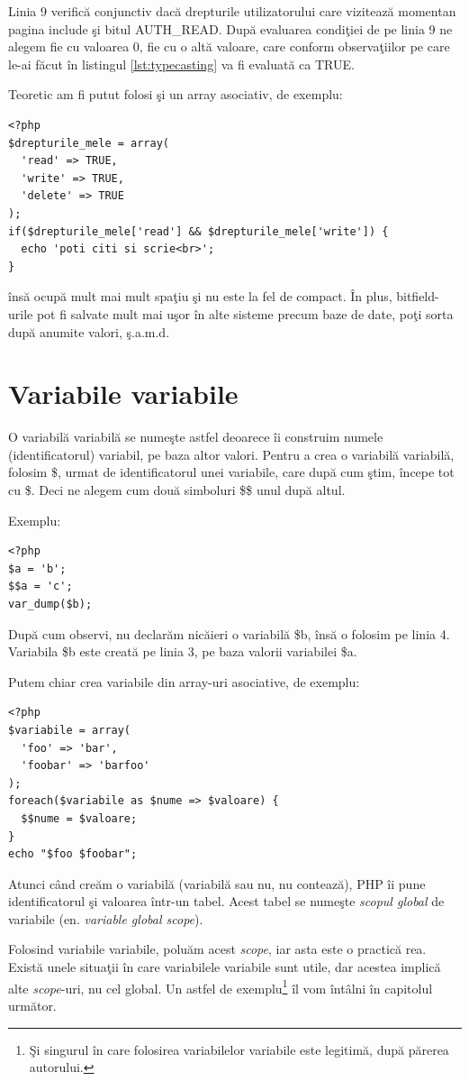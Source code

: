 Linia 9 verifică conjunctiv dacă drepturile utilizatorului care vizitează
momentan pagina include şi bitul AUTH\_READ. După evaluarea condiţiei
de pe linia 9 ne alegem fie cu valoarea 0, fie cu o altă valoare,
care conform observaţiilor pe care le-ai făcut în listingul \ref{lst:typecasting}
va fi evaluată ca TRUE.

Teoretic am fi putut folosi şi un array asociativ, de exemplu:
\begin{lstlisting}
<?php
$drepturile_mele = array(
  'read' => TRUE,
  'write' => TRUE,
  'delete' => TRUE
);
if($drepturile_mele['read'] && $drepturile_mele['write']) {
  echo 'poti citi si scrie<br>';
}
\end{lstlisting}
însă ocupă mult mai mult spaţiu şi nu este la fel de compact.
În plus, bitfield-urile pot fi salvate mult mai uşor în alte
sisteme precum baze de date, poţi sorta după anumite valori, ş.a.m.d.

\section{Variabile variabile}
O variabilă variabilă se numeşte astfel deoarece îi construim numele (identificatorul) variabil,
pe baza altor valori. Pentru a crea o variabilă variabilă, folosim \$, urmat de identificatorul unei variabile,
care după cum ştim, începe tot cu \$. Deci ne alegem cum două simboluri \$\$ unul după altul.

Exemplu:
\begin{lstlisting}
<?php
$a = 'b';
$$a = 'c';
var_dump($b);
\end{lstlisting}
După cum observi, nu declarăm nicăieri o variabilă \$b, însă o folosim pe linia 4.
Variabila \$b este creată pe linia 3, pe baza valorii variabilei \$a.

Putem chiar crea variabile din array-uri asociative, de exemplu:
\begin{lstlisting}[label=lst:varvarfromassoc,caption=Variabile variabile din array asociativ]
<?php
$variabile = array(
  'foo' => 'bar',
  'foobar' => 'barfoo'
);
foreach($variabile as $nume => $valoare) {
  $$nume = $valoare;
}
echo "$foo $foobar";
\end{lstlisting}

Atunci când creăm o variabilă (variabilă sau nu, nu contează), PHP îi pune identificatorul şi valoarea
într-un tabel. Acest tabel se numeşte \textsl{scopul global} de variabile (en. \textsl{variable global scope}).

Folosind variabile variabile, poluăm acest \textit{scope}, iar asta este o practică rea.
Există unele situaţii în care variabilele variabile sunt utile, dar acestea implică
alte \textit{scope}-uri, nu cel global. Un astfel de exemplu\footnote{Şi singurul în care
folosirea variabilelor variabile este legitimă, după părerea autorului.} îl vom întâlni
în capitolul următor.

